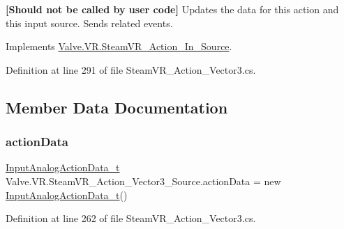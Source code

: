 {\bfseries{\mbox{[}Should not be called by user code\mbox{]}}} Updates the data for this action and this input source. Sends related events. 



Implements \mbox{\hyperlink{class_valve_1_1_v_r_1_1_steam_v_r___action___in___source_a800b521715c6cbfe32e9b0b6db7e0a16}{Valve.\+V\+R.\+Steam\+V\+R\+\_\+\+Action\+\_\+\+In\+\_\+\+Source}}.



Definition at line 291 of file Steam\+V\+R\+\_\+\+Action\+\_\+\+Vector3.\+cs.



\subsection{Member Data Documentation}
\mbox{\label{class_valve_1_1_v_r_1_1_steam_v_r___action___vector3___source_a96904099dcc5be6ebf7082294b82cc16}} 
\subsubsection{\texorpdfstring{actionData}{actionData}}
{\footnotesize\ttfamily \mbox{\hyperlink{struct_valve_1_1_v_r_1_1_input_analog_action_data__t}{Input\+Analog\+Action\+Data\+\_\+t}} Valve.\+V\+R.\+Steam\+V\+R\+\_\+\+Action\+\_\+\+Vector3\+\_\+\+Source.\+action\+Data = new \mbox{\hyperlink{struct_valve_1_1_v_r_1_1_input_analog_action_data__t}{Input\+Analog\+Action\+Data\+\_\+t}}()\hspace{0.3cm}{\ttfamily [protected]}}



Definition at line 262 of file Steam\+V\+R\+\_\+\+Action\+\_\+\+Vector3.\+cs.

\mbox{\label{class_valve_1_1_v_r_1_1_steam_v_r___action___vector3___source_a5aebd3392aec1a1b1afff3e507f2cf35}} 
